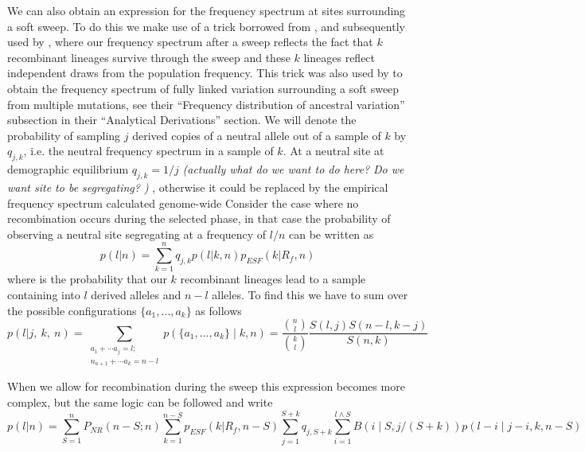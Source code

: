 \documentclass[a4paper,10pt]{article}
\newcommand{\gc}[1]{{\it \color{red} (#1)} }
\begin{document}
We can also obtain an expression for the frequency spectrum at sites surrounding a soft sweep. To do this we make use of a trick borrowed from \cite{Kimandstephan}, and subsequently used by \cite{NielsenKimetc}, where our frequency spectrum after a sweep reflects the fact that $k$ recombinant lineages survive through the sweep and these $k$ lineages reflect independent draws from the population frequency. This trick was also used by \citep{PenningandHermisson} to obtain the frequency spectrum of fully linked variation surrounding a soft sweep from multiple mutations, see their ``Frequency distribution of ancestral variation'' subsection in their ``Analytical Derivations'' section. We will denote the probability of sampling $j$ derived copies of a neutral allele out of a sample of $k$ by $q_{j,k}$, i.e. the neutral frequency spectrum in a sample of $k$. At a neutral site at demographic equilibrium $q_{j,k} = 1/j$ \gc{actually what do we want to do here? Do we want site to be segregating? }, otherwise it could be replaced by the empirical frequency spectrum calculated genome-wide \citep[as in ][]{NielsenKimetc}
Consider the case where no recombination occurs during the selected phase, in that case the probability of observing a neutral site segregating at a frequency of $l/n$ can be written as
\begin{equation}
p(l | n) =  \sum_{k=1}^{n}  q_{j,k}  p(l | k,n) p_{ESF}(k | R_f,n) 
\end{equation}
where is the probability that our $k$ recombinant lineages lead to a sample containing into $l$ derived alleles and $n-l$ alleles. To find this we have to sum over the possible configurations $\{a_1,\dots,a_k\}$ as follows
\begin{equation}
p(l | j, ~k,~n) = 
\sum_{\substack{a_1+\cdots a_j=l;\\
    n_{a+1}+\cdots a_k=n-l}} 
p(\{a_1,\dots,a_k\} \mid k, n) = \frac{ {n \choose l} }{ {k \choose l} }\frac{ S(l,j)  S(n-l,k-j)  }{ S(n,k) } \label{ESF_gives_freq_spec}
\end{equation}



When we allow for recombination during the sweep this expression becomes more complex, but the same logic can be followed and write
\begin{equation}
p(l | n) = \sum_{S=1}^n P_{NR}(n-S; n) \sum_{k=1}^{n-S} p_{ESF}(k | R_f,n-S) \sum_{j=1}^{S+k} q_{j,S+k}
\sum_{i=1}^{l \wedge S} B(i \mid S,j/(S+k)) p(l-i \mid j-i,k,n-S )
\end{equation}
\end{document}
